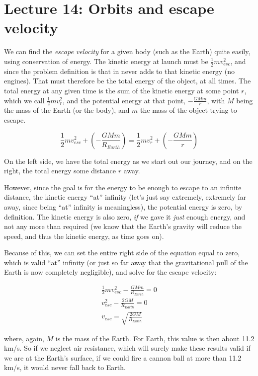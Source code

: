 \section{Lecture 14: Orbits and escape velocity}

We can find the \textit{escape velocity} for a given body (such as the Earth) quite easily, using conservation of energy. The kinetic energy at launch must be $\displaystyle \frac{1}{2} m v_{esc}^2$, and since the problem definition is that in never adds to that kinetic energy (no engines). That must therefore be the total energy of the object, at all times. The total energy at any given time is the sum of the kinetic energy at some point $r$, which we call $\displaystyle \frac{1}{2} m v_r^2$, and the potential energy at that point, $\displaystyle - \frac{G M m}{r}$, with $M$ being the mass of the Earth (or the body), and $m$ the mass of the object trying to escape.

\begin{equation}
\frac{1}{2} m v_{esc}^2 + \left(-\frac{G M m}{R_{Earth}}\right) = \frac{1}{2} m v_r^2 + \left(-\frac{G M m}{r}\right)
\end{equation}

On the left side, we have the total energy as we start out our journey, and on the right, the total energy some distance $r$ away.

However, since the goal is for the energy to be enough to escape to an infinite distance, the kinetic energy ``at'' infinity (let's just say extremely, extremely far away, since being ``at'' infinity is meaningless), the potential energy is zero, by definition. The kinetic energy is also zero, \emph{if} we gave it \emph{just} enough energy, and not any more than required (we know that the Earth's gravity will reduce the speed, and thus the kinetic energy, as time goes on).

Because of this, we can set the entire right side of the equation equal to zero, which is valid ``at'' infinity (or just so far away that the gravitational pull of the Earth is now completely negligible), and solve for the escape velocity:

\begin{align}
\frac{1}{2} m v_{esc}^2 -\frac{G M m}{R_{Earth}} = 0\\
v_{esc}^2 -\frac{2 G M}{R_{Earth}} = 0\\
v_{esc} = \sqrt{\frac{2 G M}{R_{Earth}}}
\end{align}

where, again, $M$ is the mass of the Earth. For Earth, this value is then about 11.2 km/s. So if we neglect air resistance, which will surely make these results valid if we are at the Earth's surface, if we could fire a cannon ball at more than 11.2 km/s, it would never fall back to Earth.

